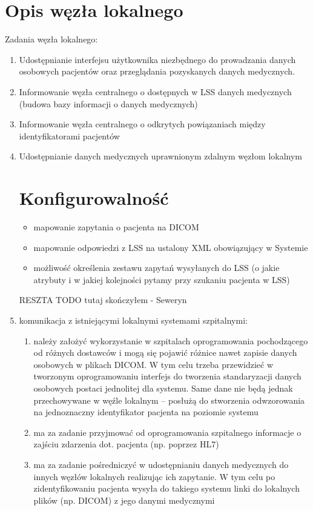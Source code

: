 \documentclass[a4paper]{report}
\begin{document}
\section{Opis węzła lokalnego}
Zadania węzła lokalnego:
\begin{enumerate}
\item Udostępnianie interfejsu użytkownika niezbędnego do prowadzania danych osobowych pacjentów
      oraz przeglądania pozyskanych danych medycznych.
\item Informowanie węzła centralnego o dostępnych w LSS danych medycznych (budowa bazy informacji o danych medycznych)
\item Informowanie węzła centralnego o odkrytych powiązaniach między identyfikatorami pacjentów
\item Udostępnianie danych medycznych uprawnionym zdalnym węzłom lokalnym

\section{Konfigurowalność}

\begin{itemize}
  \item mapowanie zapytania o pacjenta na DICOM
  \item mapowanie odpowiedzi z LSS na ustalony XML obowiązujący w Systemie
  \item możliwość określenia zestawu zapytań wysyłanych do LSS (o jakie atrybuty i w jakiej kolejności
  pytamy przy szukaniu pacjenta w LSS)
\end{itemize}

RESZTA TODO tutaj skończyłem - Seweryn

\item komunikacja z istniejącymi lokalnymi systemami szpitalnymi:
  \begin{enumerate}
  \item należy założyć wykorzystanie w szpitalach oprogramowania pochodzącego od różnych dostawców i mogą
        się pojawić różnice nawet zapisie danych osobowych w plikach DICOM. W tym celu trzeba przewidzieć
        w tworzonym oprogramowaniu interfejs do tworzenia standaryzacji danych osobowych postaci jednolitej
        dla systemu. Same dane nie będą jednak przechowywane w węźle lokalnym – posłużą do stworzenia odwzorowania
        na jednoznaczny identyfikator pacjenta na poziomie systemu
  \item ma za zadanie przyjmować od oprogramowania szpitalnego informacje o zajściu zdarzenia dot.
        pacjenta (np. poprzez HL7)
  \item ma za zadanie pośredniczyć w udostępnianiu danych medycznych do innych węzłów lokalnych realizując
        ich zapytanie. W tym celu po zidentyfikowaniu pacjenta wysyła do takiego systemu linki do lokalnych
        plików (np. DICOM) z jego danymi medycznymi
  \end{enumerate}


\end{enumerate}
\end{document}
